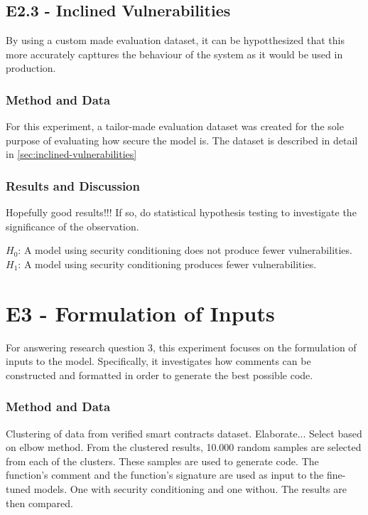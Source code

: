 \subsection{E2.3 - Inclined Vulnerabilities}
\label{sec:e2.3-inclined-vulnerabilities}
By using a custom made evaluation dataset, it can be hypotthesized that this more accurately capttures the behaviour of the system as it would be used in production.

\subsubsection{Method and Data}
For this experiment, a tailor-made evaluation dataset was created for the sole purpose of evaluating how secure the model is. The dataset is described in detail in \cref{sec:inclined-vulnerabilities}

\subsubsection{Results and Discussion}
Hopefully good results!!! If so, do statistical hypothesis testing to investigate the significance of the observation.

\textbf{\(H_0\)}: A model using security conditioning does not produce fewer vulnerabilities. 
\textbf{\(H_1\)}: A model using security conditioning produces fewer vulnerabilities.


\section{E3 - Formulation of Inputs}
\label{sec:e3-formulation-of-inputs}
For answering research question 3, this experiment focuses on the formulation of inputs to the model. Specifically, it investigates how comments can be constructed and formatted in order to generate the best possible code.

\subsubsection{Method and Data}
Clustering of data from verified smart contracts dataset. Elaborate... Select based on elbow method. From the clustered results, 10.000 random samples are selected from each of the clusters. These samples are used to generate code. The function's comment and the function's signature are used as input to the fine-tuned models. One with security conditioning and one withou. The results are then compared.

